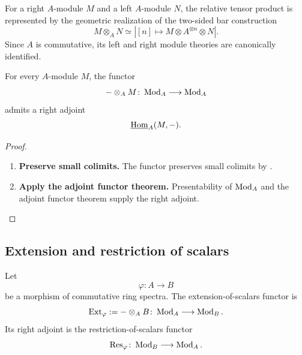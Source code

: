 \begin{construction}
\label{con:spectral-relative-tensor-product}
For a right $A$-module $M$ and a left $A$-module $N$, the relative tensor
product is represented by the geometric realization of the two-sided bar
construction
\[
    M\otimes_A N
    \simeq
    \left|
        [n]
        \longmapsto
        M\otimes A^{\otimes n}\otimes N
    \right|.
\]
Since $A$ is commutative, its left and right module theories are
canonically identified.
\end{construction}

\begin{proposition}
\label{prop:module-spectra-closedness}
For every $A$-module $M$, the functor
\[
    -\otimes_A M
    \colon
    \operatorname{Mod}_A
    \longrightarrow
    \operatorname{Mod}_A
\]
admits a right adjoint
\[
    \underline{\operatorname{Hom}}_A(M,-).
\]
\end{proposition}

\begin{proof}
\leavevmode
\begin{enumerate}[label=\textup{(\arabic*)}]
    \item \textbf{Preserve small colimits.}
    The functor preserves small colimits by
    .

    \item \textbf{Apply the adjoint functor theorem.}
    Presentability of $\operatorname{Mod}_A$ and the
    adjoint functor theorem supply the right adjoint.
\end{enumerate}
\end{proof}

\subsection{Extension and restriction of scalars}

\begin{definition}
\label{def:spectral-extension-restriction-scalars}
Let
\[
    \varphi
    \colon
    A
    \longrightarrow
    B
\]
be a morphism of commutative ring spectra. The extension-of-scalars
functor is
\[
    \operatorname{Ext}_{\varphi}
    :=
    -\otimes_A B
    \colon
    \operatorname{Mod}_A
    \longrightarrow
    \operatorname{Mod}_B.
\]
Its right adjoint is the restriction-of-scalars functor
\[
    \operatorname{Res}_{\varphi}
    \colon
    \operatorname{Mod}_B
    \longrightarrow
    \operatorname{Mod}_A.
\]
\end{definition}

